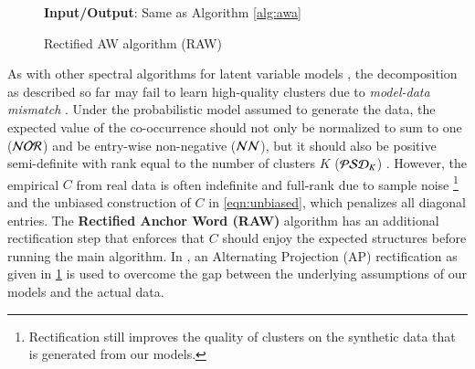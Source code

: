 \begin{figure}[ht]
	\begin{algorithm}[H]
		\DontPrintSemicolon
	    \textbf{Input/Output}: Same as Algorithm \ref{alg:awa}\;
		\caption{Rectified AW algorithm (RAW)}
	\label{alg:rawa}        
	\end{algorithm}
\end{figure}

As with other spectral algorithms for latent variable models 
\cite{hsu2012spectral,anandkumar2012}, the decomposition as described so far may
fail to learn high\hyp{}quality clusters due to \textit{model-data  mismatch} 
\cite{kulesza2014low}. Under the probabilistic model assumed to generate the
data, the expected value of the co\hyp{}occurrence should not only be normalized
to sum to one ($\mathcal{NOR}$) and be entry\hyp{}wise non\hyp{}negative ($\mathcal{NN}$), but it
should also be positive semi\hyp{}definite with rank equal to the number of
clusters $K$ ($\mathcal{PSD}_K$) \cite{moontae2015nips}. However, the empirical $C$
from real data is often indefinite and full\hyp{}rank due to sample noise
\footnote{Rectification still improves the quality of clusters on the synthetic
data that is generated from our models.} and the unbiased construction of $C$
in \cref{eqn:unbiased}, which penalizes all diagonal entries. The 
\textbf{Rectified Anchor Word (RAW)} algorithm has an additional rectification step that enforces that $C$ should enjoy the expected structures
before running the main algorithm. In \cite{moontae2015nips}, an Alternating
Projection (AP) rectification as given in \cref{alg:rawa} is used to
overcome the gap between the underlying assumptions of our models and the actual
data.

